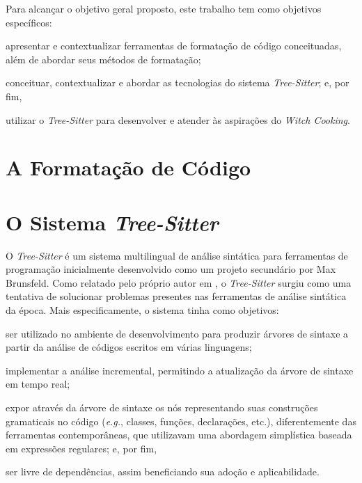 \documentclass[11pt, a4paper, english, openright, twoside, brazil]{abntex2}
\begin{document}
Para alcançar o objetivo geral proposto, este trabalho tem como objetivos
específicos:
\begin{inparaenum}
  \item apresentar e contextualizar ferramentas de formatação de código
        conceituadas, além de abordar seus métodos de formatação;
  \item conceituar, contextualizar e abordar as tecnologias do sistema
        \textit{Tree-Sitter}; e, por fim,
  \item utilizar o \textit{Tree-Sitter} para desenvolver e atender às
        aspirações do \textit{Witch Cooking}.
\end{inparaenum}


\chapter{A Formatação de Código}


\chapter{O Sistema \textit{Tree-Sitter}}

O \textit{Tree-Sitter} é um sistema multilingual de análise sintática para
ferramentas de programação inicialmente desenvolvido como um projeto secundário
por Max Brunsfeld. Como relatado pelo próprio autor em \cite{github-2017-tree},
o \textit{Tree-Sitter} surgiu como uma tentativa de solucionar problemas
presentes nas ferramentas de análise sintática da época. Mais especificamente,
o sistema tinha como objetivos:
\begin{inparaenum}
  \item ser utilizado no ambiente de desenvolvimento para produzir árvores de
        sintaxe a partir da análise de códigos escritos em várias linguagens;
  \item implementar a análise incremental, permitindo a atualização da árvore
        de sintaxe em tempo real;
  \item expor através da árvore de sintaxe os nós representando suas
        construções gramaticais no código (\textit{e.g.}, classes, funções,
        declarações, etc.), diferentemente das ferramentas contemporâneas, que
        utilizavam uma abordagem simplística baseada em expressões regulares;
        e, por fim,
  \item ser livre de dependências, assim beneficiando sua adoção e
        aplicabilidade.
\end{inparaenum}
\end{document}
